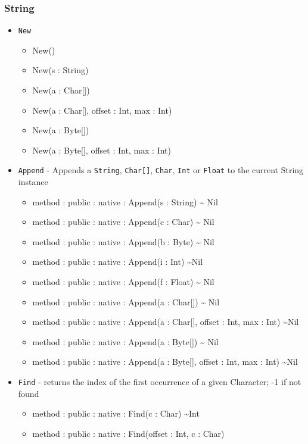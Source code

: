 \documentclass[11pt]{article}
\begin{document}
\subsubsection{String}
\begin{itemize}
\item \texttt{New}
  \begin{itemize}
  \item New()
  \item New(s : String)
  \item New(a : Char[])
  \item New(a : Char[], offset : Int, max : Int)
  \item New(a : Byte[])
  \item New(a : Byte[], offset : Int, max : Int)
  \end{itemize}
\item \texttt{Append} - Appends a \texttt{String}, \texttt{Char[]},
  \texttt{Char}, \texttt{Int} or \texttt{Float} to the current String
  instance
  \begin{itemize}
  \item method : public : native : Append(s : String) \textasciitilde
    Nil
  \item method : public : native : Append(c : Char) \textasciitilde
    Nil
  \item method : public : native : Append(b : Byte) \textasciitilde
    Nil
  \item method : public : native : Append(i : Int) \textasciitilde Nil
  \item method : public : native : Append(f : Float) \textasciitilde
    Nil
  \item method : public : native : Append(a : Char[]) \textasciitilde
    Nil
  \item method : public : native : Append(a : Char[], offset : Int,
    max : Int) \textasciitilde Nil
  \item method : public : native : Append(a : Byte[]) \textasciitilde
    Nil
  \item method : public : native : Append(a : Byte[], offset : Int,
    max : Int) \textasciitilde Nil
  \end{itemize}
\item \texttt{Find} - returns the index of the first occurrence of a
  given Character; -1 if not found
  \begin{itemize}
  \item method : public : native : Find(c : Char) \textasciitilde Int
  \item method : public : native : Find(offset : Int, c : Char)

\end{itemize}
\end{itemize}
\end{document}
